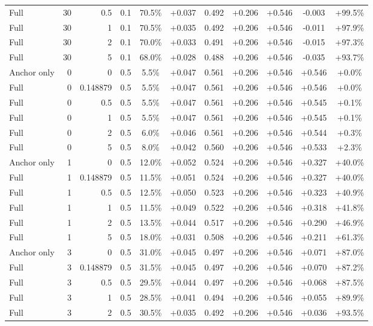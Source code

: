 \begin{table}[htbp]
\begin{tabular}{lrrrccccccc}
Full & 30 & 0.5 & 0.1 & 70.5\% & +0.037 & 0.492 & +0.206 & +0.546 & -0.003 & +99.5\% \\
Full & 30 & 1 & 0.1 & 70.5\% & +0.035 & 0.492 & +0.206 & +0.546 & -0.011 & +97.9\% \\
Full & 30 & 2 & 0.1 & 70.0\% & +0.033 & 0.491 & +0.206 & +0.546 & -0.015 & +97.3\% \\
Full & 30 & 5 & 0.1 & 68.0\% & +0.028 & 0.488 & +0.206 & +0.546 & -0.035 & +93.7\% \\
Anchor only & 0 & 0 & 0.5 & 5.5\% & +0.047 & 0.561 & +0.206 & +0.546 & +0.546 & +0.0\% \\
Full & 0 & 0.148879 & 0.5 & 5.5\% & +0.047 & 0.561 & +0.206 & +0.546 & +0.546 & +0.0\% \\
Full & 0 & 0.5 & 0.5 & 5.5\% & +0.047 & 0.561 & +0.206 & +0.546 & +0.545 & +0.1\% \\
Full & 0 & 1 & 0.5 & 5.5\% & +0.047 & 0.561 & +0.206 & +0.546 & +0.545 & +0.1\% \\
Full & 0 & 2 & 0.5 & 6.0\% & +0.046 & 0.561 & +0.206 & +0.546 & +0.544 & +0.3\% \\
Full & 0 & 5 & 0.5 & 8.0\% & +0.042 & 0.560 & +0.206 & +0.546 & +0.533 & +2.3\% \\
Anchor only & 1 & 0 & 0.5 & 12.0\% & +0.052 & 0.524 & +0.206 & +0.546 & +0.327 & +40.0\% \\
Full & 1 & 0.148879 & 0.5 & 11.5\% & +0.051 & 0.524 & +0.206 & +0.546 & +0.327 & +40.0\% \\
Full & 1 & 0.5 & 0.5 & 12.5\% & +0.050 & 0.523 & +0.206 & +0.546 & +0.323 & +40.9\% \\
Full & 1 & 1 & 0.5 & 11.5\% & +0.049 & 0.522 & +0.206 & +0.546 & +0.318 & +41.8\% \\
Full & 1 & 2 & 0.5 & 13.5\% & +0.044 & 0.517 & +0.206 & +0.546 & +0.290 & +46.9\% \\
Full & 1 & 5 & 0.5 & 18.0\% & +0.031 & 0.508 & +0.206 & +0.546 & +0.211 & +61.3\% \\
Anchor only & 3 & 0 & 0.5 & 31.0\% & +0.045 & 0.497 & +0.206 & +0.546 & +0.071 & +87.0\% \\
Full & 3 & 0.148879 & 0.5 & 31.5\% & +0.045 & 0.497 & +0.206 & +0.546 & +0.070 & +87.2\% \\
Full & 3 & 0.5 & 0.5 & 29.5\% & +0.044 & 0.497 & +0.206 & +0.546 & +0.068 & +87.5\% \\
Full & 3 & 1 & 0.5 & 28.5\% & +0.041 & 0.494 & +0.206 & +0.546 & +0.055 & +89.9\% \\
Full & 3 & 2 & 0.5 & 30.5\% & +0.035 & 0.492 & +0.206 & +0.546 & +0.036 & +93.5\% \\

\end{tabular}
\end{table}
